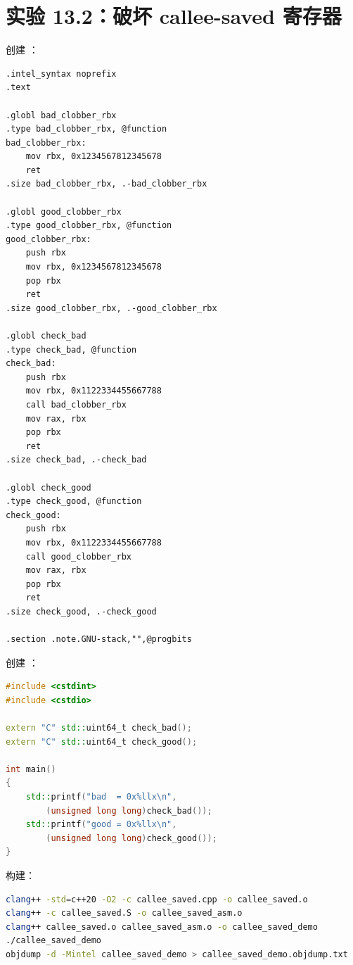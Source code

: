 \section{实验 13.2：破坏 callee-saved 寄存器}

\begin{labbox}
创建 ：

\begin{lstlisting}
.intel_syntax noprefix
.text

.globl bad_clobber_rbx
.type bad_clobber_rbx, @function
bad_clobber_rbx:
    mov rbx, 0x1234567812345678
    ret
.size bad_clobber_rbx, .-bad_clobber_rbx

.globl good_clobber_rbx
.type good_clobber_rbx, @function
good_clobber_rbx:
    push rbx
    mov rbx, 0x1234567812345678
    pop rbx
    ret
.size good_clobber_rbx, .-good_clobber_rbx

.globl check_bad
.type check_bad, @function
check_bad:
    push rbx
    mov rbx, 0x1122334455667788
    call bad_clobber_rbx
    mov rax, rbx
    pop rbx
    ret
.size check_bad, .-check_bad

.globl check_good
.type check_good, @function
check_good:
    push rbx
    mov rbx, 0x1122334455667788
    call good_clobber_rbx
    mov rax, rbx
    pop rbx
    ret
.size check_good, .-check_good

.section .note.GNU-stack,"",@progbits
\end{lstlisting}

创建 ：

\begin{lstlisting}[language=C++]
#include <cstdint>
#include <cstdio>

extern "C" std::uint64_t check_bad();
extern "C" std::uint64_t check_good();

int main()
{
    std::printf("bad  = 0x%llx\n",
        (unsigned long long)check_bad());
    std::printf("good = 0x%llx\n",
        (unsigned long long)check_good());
}
\end{lstlisting}

构建：

\begin{lstlisting}[language=bash]
clang++ -std=c++20 -O2 -c callee_saved.cpp -o callee_saved.o
clang++ -c callee_saved.S -o callee_saved_asm.o
clang++ callee_saved.o callee_saved_asm.o -o callee_saved_demo
./callee_saved_demo
objdump -d -Mintel callee_saved_demo > callee_saved_demo.objdump.txt
\end{lstlisting}


\end{labbox}
